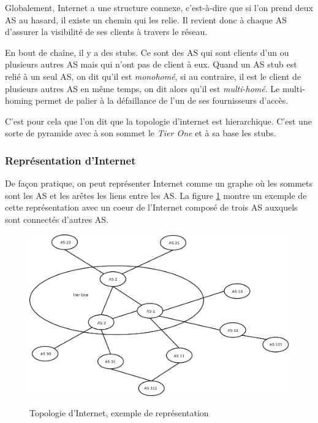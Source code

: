 \par
Globalement, Internet a une structure connexe, c'est-\`a-dire que si l'on prend deux AS au hasard, il existe un chemin qui les relie. Il revient donc \`a chaque AS d'assurer la visibilit\'e de ses clients \`a travers le r\'eseau.
\par
En bout de cha\^ine, il y a des stubs. Ce sont des AS qui sont clients d'un ou plusieurs autres AS mais qui n'ont pas de client \`a eux. Quand un AS stub est reli\'e \`a un seul AS, on dit qu'il est \textit{monohom\'e}, si au contraire, il est le client de plusieurs autres AS en m\^eme temps, on dit alors qu'il est \textit{multi-hom\'e}. Le multi-homing permet de palier à la défaillance de l'un de ses fournisseurs d'accès.
\par
C'est pour cela que l'on dit que la topologie d'internet est hierarchique. C'est une sorte de pyramide avec à son sommet le \textit{Tier One} et à sa base les stubs.

\subsubsection{Repr\'esentation d'Internet}
\par
De fa\c con pratique, on peut repr\'esenter Internet comme un graphe o\`u les sommets sont les AS et les ar\^etes les liens entre les AS. La figure \ref{topologie} montre un exemple de cette repr\'esentation avec un coeur de l'Internet compos\'e de trois AS auxquels sont connect\'es d'autres AS. 

\begin{figure}[H]
\centering
 \fbox
 {
 \includegraphics[width=16cm]{./schema/topologie_internet.png}
 }
  \caption{\label{topologie}Topologie d'Internet, exemple de repr\'esentation}
\end{figure}



%
